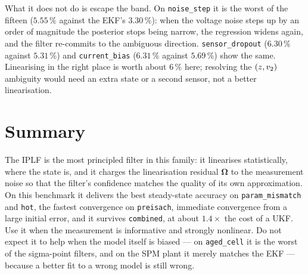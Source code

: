 What it does not do is escape the band. On \texttt{noise\_step} it is the worst of the fifteen
($5.55\,\%$ against the EKF's $3.30\,\%$): when the voltage noise steps up by an order of
magnitude the posterior stops being narrow, the regression widens again, and the filter
re-commits to the ambiguous direction. \texttt{sensor\_dropout} ($6.30\,\%$ against $5.31\,\%$)
and \texttt{current\_bias} ($6.31\,\%$ against $5.69\,\%$) show the same. Linearising in the
right place is worth about $6\,\%$ here; resolving the $(z,v_2)$ ambiguity would need an
extra state or a second sensor, not a better linearisation.

\section{Summary}
The IPLF is the most principled filter in this family: it linearises statistically, where the
state is, and it charges the linearisation residual $\bm\Omega$ to the measurement noise so
that the filter's confidence matches the quality of its own approximation. On this benchmark it
delivers the best steady-state accuracy on \texttt{param\_mismatch} and \texttt{hot}, the
fastest convergence on \texttt{preisach}, immediate convergence from a large initial error, and
it survives \texttt{combined}, at about $1.4\times$ the cost of a UKF. Use it when the
measurement is informative and strongly nonlinear. Do not expect it to help when the model
itself is biased --- on \texttt{aged\_cell} it is the worst of the sigma-point filters, and on
the SPM plant it merely matches the EKF --- because a better fit to a wrong model is still
wrong.
